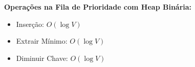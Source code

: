 \documentclass[preview]{standalone}
\begin{document}
\begin{center}
\textbf{Operações na Fila de Prioridade com Heap Binária:}
            \begin{itemize}
                \item Inserção: $O(\log V)$
                \item Extrair Mínimo: $O(\log V)$
                \item Diminuir Chave: $O(\log V)$
            \end{itemize}
\end{center}
\end{document}
